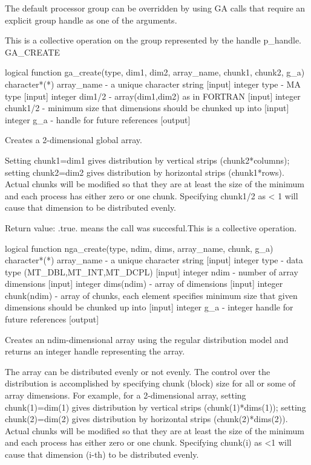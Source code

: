 The default processor group can be overridden by using GA calls that
require an explicit group handle as one of the arguments.

This is a collective operation on the group represented by the handle
p\_handle. GA\_CREATE

logical function ga\_create(type, dim1, dim2, array\_name, chunk1,
chunk2, g\_a) character{*}({*}) array\_name - a unique character string
{[}input{]} integer type - MA type {[}input{]} integer dim1/2 - array(dim1,dim2)
as in FORTRAN {[}input{]} integer chunk1/2 - minimum size that dimensions
should be chunked up into {[}input{]} integer g\_a - handle for future
references {[}output{]}

Creates a 2-dimensional global array.

Setting chunk1=dim1 gives distribution by vertical strips (chunk2{*}columns);
setting chunk2=dim2 gives distribution by horizontal strips (chunk1{*}rows).
Actual chunks will be modified so that they are at least the size
of the minimum and each process has either zero or one chunk. Specifying
chunk1/2 as < 1 will cause that dimension to be distributed evenly.

Return value: .true. means the call was succesful.This is a collective
operation.

logical function nga\_create(type, ndim, dims, array\_name, chunk,
g\_a) character{*}({*}) array\_name - a unique character string {[}input{]}
integer type - data type (MT\_DBL,MT\_INT,MT\_DCPL) {[}input{]} integer
ndim - number of array dimensions {[}input{]} integer dims(ndim) -
array of dimensions {[}input{]} integer chunk(ndim) - array of chunks,
each element specifies minimum size that given dimensions should be
chunked up into {[}input{]} integer g\_a - integer handle for future
references {[}output{]}

Creates an ndim-dimensional array using the regular distribution model
and returns an integer handle representing the array.

The array can be distributed evenly or not evenly. The control over
the distribution is accomplished by specifying chunk (block) size
for all or some of array dimensions. For example, for a 2-dimensional
array, setting chunk(1)=dim(1) gives distribution by vertical strips
(chunk(1){*}dims(1)); setting chunk(2)=dim(2) gives distribution by
horizontal strips (chunk(2){*}dims(2)). Actual chunks will be modified
so that they are at least the size of the minimum and each process
has either zero or one chunk. Specifying chunk(i) as <1 will cause
that dimension (i-th) to be distributed evenly.

